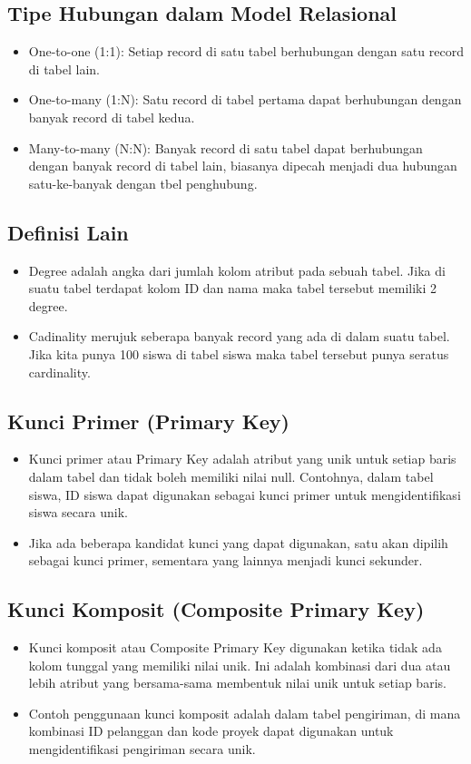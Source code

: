 \documentclass{article}
\begin{document}
\subsection{Tipe Hubungan dalam Model Relasional}
\begin{itemize}
    \item One-to-one (1:1): Setiap record di satu tabel berhubungan dengan satu record di tabel lain.
    \item One-to-many (1:N): Satu record di tabel pertama dapat berhubungan dengan banyak record di tabel kedua.
    \item Many-to-many (N:N): Banyak record di satu tabel dapat berhubungan dengan banyak record di tabel lain, biasanya dipecah menjadi dua hubungan satu-ke-banyak dengan tbel penghubung.
\end{itemize}

\subsection{Definisi Lain}
\begin{itemize}
    \item Degree adalah angka dari jumlah kolom atribut pada sebuah tabel. Jika di suatu tabel terdapat kolom ID dan nama maka tabel tersebut memiliki 2 degree.
    \item Cadinality merujuk seberapa banyak record yang ada di dalam suatu tabel. Jika kita punya 100 siswa di tabel siswa maka tabel tersebut punya seratus cardinality.
\end{itemize}

\subsection{Kunci Primer (Primary Key)}
\begin{itemize}
    \item Kunci primer atau Primary Key adalah atribut yang unik untuk setiap baris dalam tabel dan tidak boleh memiliki nilai null. Contohnya, dalam tabel siswa, ID siswa dapat digunakan sebagai kunci primer untuk mengidentifikasi siswa secara unik.
    \item Jika ada beberapa kandidat kunci yang dapat digunakan, satu akan dipilih sebagai kunci primer, sementara yang lainnya menjadi kunci sekunder.
\end{itemize}

\subsection{Kunci Komposit (Composite Primary Key)}
\begin{itemize}
    \item Kunci komposit atau Composite Primary Key digunakan ketika tidak ada kolom tunggal yang memiliki nilai unik. Ini adalah kombinasi dari dua atau lebih atribut yang bersama-sama membentuk nilai unik untuk setiap baris.
    \item Contoh penggunaan kunci komposit adalah dalam tabel pengiriman, di mana kombinasi ID pelanggan dan kode proyek dapat digunakan untuk mengidentifikasi pengiriman secara unik.
\end{itemize}
\end{document}
